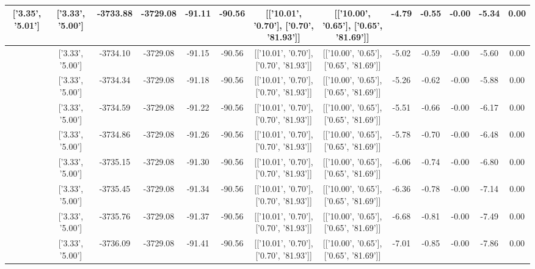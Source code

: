 \begin{table}[htbp]
\begin{adjustbox}{angle=90}
\begin{tabular}{|c|c|c|c|c|c|c|c|c|c|c|c|c|}
 ['3.35', '5.01'] & ['3.33', '5.00'] & -3733.88 & -3729.08 & -91.11 & -90.56 & [['10.01', '0.70'], ['0.70', '81.93']] & [['10.00', '0.65'], ['0.65', '81.69']] & -4.79 & -0.55 & -0.00 & -5.34 & 0.00\\ \hline
 ['3.35', '5.02'] & ['3.33', '5.00'] & -3734.10 & -3729.08 & -91.15 & -90.56 & [['10.01', '0.70'], ['0.70', '81.93']] & [['10.00', '0.65'], ['0.65', '81.69']] & -5.02 & -0.59 & -0.00 & -5.60 & 0.00\\ \hline
 ['3.35', '5.02'] & ['3.33', '5.00'] & -3734.34 & -3729.08 & -91.18 & -90.56 & [['10.01', '0.70'], ['0.70', '81.93']] & [['10.00', '0.65'], ['0.65', '81.69']] & -5.26 & -0.62 & -0.00 & -5.88 & 0.00\\ \hline
 ['3.35', '5.02'] & ['3.33', '5.00'] & -3734.59 & -3729.08 & -91.22 & -90.56 & [['10.01', '0.70'], ['0.70', '81.93']] & [['10.00', '0.65'], ['0.65', '81.69']] & -5.51 & -0.66 & -0.00 & -6.17 & 0.00\\ \hline
 ['3.35', '5.02'] & ['3.33', '5.00'] & -3734.86 & -3729.08 & -91.26 & -90.56 & [['10.01', '0.70'], ['0.70', '81.93']] & [['10.00', '0.65'], ['0.65', '81.69']] & -5.78 & -0.70 & -0.00 & -6.48 & 0.00\\ \hline
 ['3.35', '5.02'] & ['3.33', '5.00'] & -3735.15 & -3729.08 & -91.30 & -90.56 & [['10.01', '0.70'], ['0.70', '81.93']] & [['10.00', '0.65'], ['0.65', '81.69']] & -6.06 & -0.74 & -0.00 & -6.80 & 0.00\\ \hline
 ['3.35', '5.02'] & ['3.33', '5.00'] & -3735.45 & -3729.08 & -91.34 & -90.56 & [['10.01', '0.70'], ['0.70', '81.93']] & [['10.00', '0.65'], ['0.65', '81.69']] & -6.36 & -0.78 & -0.00 & -7.14 & 0.00\\ \hline
 ['3.36', '5.02'] & ['3.33', '5.00'] & -3735.76 & -3729.08 & -91.37 & -90.56 & [['10.01', '0.70'], ['0.70', '81.93']] & [['10.00', '0.65'], ['0.65', '81.69']] & -6.68 & -0.81 & -0.00 & -7.49 & 0.00\\ \hline
 ['3.36', '5.02'] & ['3.33', '5.00'] & -3736.09 & -3729.08 & -91.41 & -90.56 & [['10.01', '0.70'], ['0.70', '81.93']] & [['10.00', '0.65'], ['0.65', '81.69']] & -7.01 & -0.85 & -0.00 & -7.86 & 0.00\\ \hline
            \end{tabular}
        \end{adjustbox}
        \caption{}
        \label{}
    \end{table}
    